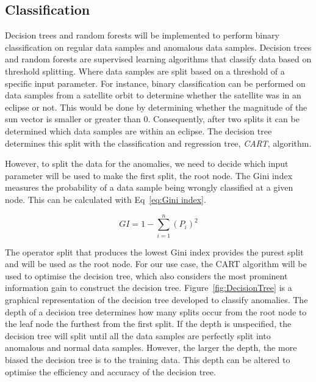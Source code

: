 \documentclass[letterpaper, 10 pt, conference]{ieeeconf}  %
\begin{document}
\subsection{Classification}
Decision trees and random forests will be implemented to perform binary classification on regular data samples and anomalous data samples. Decision trees \cite{Reif2008} and random forests \cite{Shi2006, Paul2018, Primartha2018} are supervised learning algorithms that classify data based on threshold splitting. Where data samples are split based on a threshold of a specific input parameter. For instance, binary classification can be performed on data samples from a satellite orbit to determine whether the satellite was in an eclipse or not. This would be done by determining whether the magnitude of the sun vector is smaller or greater than $0$. Consequently, after two splits it can be determined which data samples are within an eclipse. The decision tree determines this split with the classification and regression tree, \emph{CART}, algorithm.

However, to split the data for the anomalies, we need to decide which input parameter will be used to make the first split, the root node. The Gini index measures the probability of a data sample being wrongly classified at a given node. This can be calculated with Eq~\ref{eq:Gini index}.

\begin{equation}
GI = 1 - \sum_{i = 1}^{n}{(P_i)^2}
\label{eq:Gini index}
\end{equation}

The operator split that produces the lowest Gini index provides the purest split and will be used as the root node. For our use case, the CART algorithm will be used to optimise the decision tree, which also considers the most prominent information gain to construct the decision tree. Figure~\ref{fig:DecisionTree} is a graphical representation of the decision tree developed to classify anomalies. The depth of a decision tree determines how many splits occur from the root node to the leaf node the furthest from the first split. If the depth is unspecified, the decision tree will split until all the data samples are perfectly split into anomalous and normal data samples. However, the larger the depth, the more biased the decision tree is to the training data. This depth can be altered to optimise the efficiency and accuracy of the decision tree.
\end{document}
